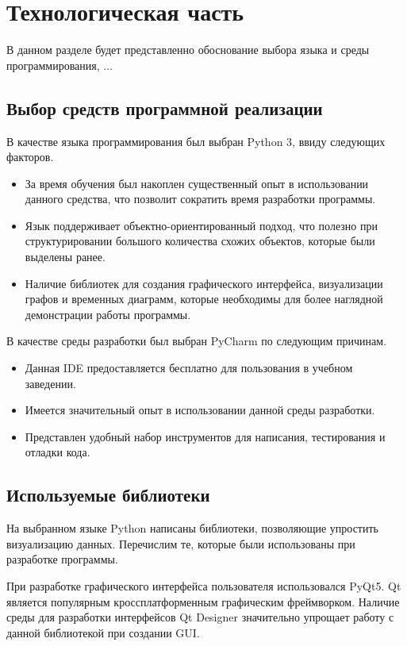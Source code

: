 \section{Технологическая часть}

В данном разделе будет представленно обоснование выбора языка и среды программирования, ...

\subsection{Выбор средств программной реализации}
В качестве языка программирования был выбран Python 3, ввиду следующих факторов.

\begin{itemize}
	\item За время обучения был накоплен существенный опыт в использовании данного средства, что позволит сократить время разработки программы.
	\item Язык поддерживает объектно-ориентированный подход, что полезно при структурировании большого количества схожих объектов, которые были выделены ранее.
	\item Наличие библиотек для создания графического интерфейса, визуализации графов и временных диаграмм, которые необходимы для более наглядной демонстрации работы программы.
\end{itemize}
\qquad
В качестве среды разработки был выбран PyCharm по следующим причинам.
\begin{itemize}
	\item Данная IDE предоставляется бесплатно для пользования в учебном заведении\cite{tech:pycharm}.
	\item Имеется значительный опыт в использовании данной среды разработки.
	\item Представлен удобный набор инструментов для написания, тестирования и отладки кода.
\end{itemize}

\subsection{Используемые библиотеки}
На выбранном языке Python написаны библиотеки, позволяющие упростить визуализацию данных. Перечислим те, которые были использованы при разработке программы.

При разработке графического интерфейса пользователя использовался
PyQt5. Qt является популярным кроссплатформенным графическим фреймворком\cite{libs:pyqt}. Наличие среды для разработки интерфейсов Qt Designer значительно упрощает работу с данной библиотекой при создании GUI.

